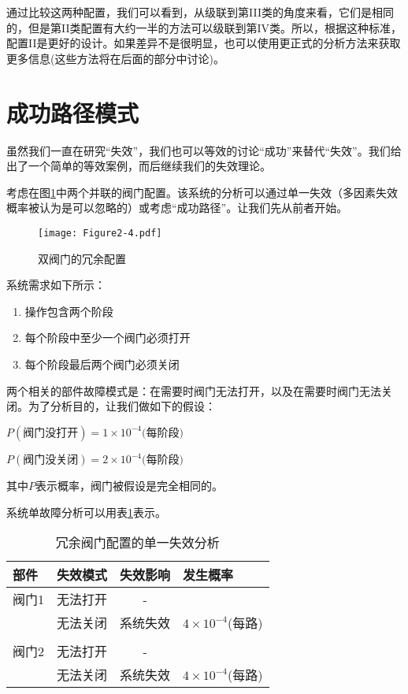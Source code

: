 \documentclass[cn,11pt,chinese]{elegantbook}
\begin{document}
通过比较这两种配置，我们可以看到，从级联到第III类的角度来看，它们是相同的，但是第II类配置有大约一半的方法可以级联到第IV类。所以，根据这种标准，配置II是更好的设计。如果差异不是很明显，也可以使用更正式的分析方法来获取更多信息(这些方法将在后面的部分中讨论)。

\section{成功路径模式}

虽然我们一直在研究“失效”，我们也可以等效的讨论“成功”来替代“失效”。我们给出了一个简单的等效案例，而后继续我们的失效理论。


考虑在图\ref{fig:fig2_4}中两个并联的阀门配置。该系统的分析可以通过单一失效（多因素失效概率被认为是可以忽略的）或考虑“成功路径”。让我们先从前者开始。

\begin{figure}[h]
	\centering
	\texttt{[image: Figure2-4.pdf]}
	\caption{双阀门的冗余配置}\label{fig:fig2_4}
\end{figure}

系统需求如下所示：

\begin{enumerate}
	\item 操作包含两个阶段
	\item 每个阶段中至少一个阀门必须打开
	\item 每个阶段最后两个阀门必须关闭
\end{enumerate}


两个相关的部件故障模式是：在需要时阀门无法打开，以及在需要时阀门无法关闭。为了分析目的，让我们做如下的假设：

$P(\mbox{阀门没打开}) = 1 \times 10^{-4}\mbox{(每阶段)}$

$P(\mbox{阀门没关闭}) = 2 \times 10^{-4}\mbox{(每阶段)}$

其中$P$表示概率，阀门被假设是完全相同的。

系统单故障分析可以用表\ref{tab:tab2_6}表示。


\begin{table}[htpb]
	\centering
	\caption{冗余阀门配置的单一失效分析}\label{tab:tab2_6}
	\begin{tabular}{@{}llll@{}}
		\toprule
		部件  & 失效模式 & 失效影响                  & 发生概率                 \\ \midrule
		阀门1 & 无法打开 & \multicolumn{1}{c}{-} &                      \\
		& 无法关闭 & 系统失效                  & $4\times10^{-4}$(每路) \\
		&      &                       &                      \\
		阀门2 & 无法打开 & \multicolumn{1}{c}{-} &                      \\
		& 无法关闭 & 系统失效                  & $4\times10^{-4}$(每路) \\ \bottomrule
	\end{tabular}
\end{table}
\end{document}
